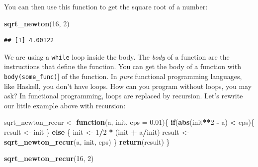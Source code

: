 \documentclass[]{gitbook}
\newenvironment{Shaded}{\begin{snugshade}}{\end{snugshade}}
\newcommand{\ControlFlowTok}[1]{\textcolor[rgb]{0.13,0.29,0.53}{\textbf{#1}}}
\newcommand{\DataTypeTok}[1]{\textcolor[rgb]{0.13,0.29,0.53}{#1}}
\newcommand{\DecValTok}[1]{\textcolor[rgb]{0.00,0.00,0.81}{#1}}
\newcommand{\FloatTok}[1]{\textcolor[rgb]{0.00,0.00,0.81}{#1}}
\newcommand{\KeywordTok}[1]{\textcolor[rgb]{0.13,0.29,0.53}{\textbf{#1}}}
\newcommand{\NormalTok}[1]{#1}
\newcommand{\OperatorTok}[1]{\textcolor[rgb]{0.81,0.36,0.00}{\textbf{#1}}}
\newcommand{\StringTok}[1]{\textcolor[rgb]{0.31,0.60,0.02}{#1}}
\theoremstyle{definition}
\theoremstyle{definition}
\theoremstyle{definition}
\theoremstyle{remark}
\begin{document}
You can then use this function to get the square root of a number:

\begin{Shaded}
\begin{Highlighting}[]
\KeywordTok{sqrt_newton}\NormalTok{(}\DecValTok{16}\NormalTok{, }\DecValTok{2}\NormalTok{)}
\end{Highlighting}
\end{Shaded}

\begin{verbatim}
## [1] 4.00122
\end{verbatim}

We are using a \texttt{while} loop inside the body. The \emph{body} of a
function are the instructions that define the function. You can get the
body of a function with \texttt{body(some\_func)}{]} of the function. In
\emph{pure} functional programming languages, like Haskell, you don't
have loops. How can you program without loops, you may ask? In
functional programming, loops are replaced by recursion. Let's rewrite
our little example above with recursion:

\begin{Shaded}
\begin{Highlighting}[]
\NormalTok{sqrt_newton_recur <-}\StringTok{ }\ControlFlowTok{function}\NormalTok{(a, init, }\DataTypeTok{eps =} \FloatTok{0.01}\NormalTok{)\{}
    \ControlFlowTok{if}\NormalTok{(}\KeywordTok{abs}\NormalTok{(init}\OperatorTok{**}\DecValTok{2} \OperatorTok{-}\StringTok{ }\NormalTok{a) }\OperatorTok{<}\StringTok{ }\NormalTok{eps)\{}
\NormalTok{        result <-}\StringTok{ }\NormalTok{init}
\NormalTok{    \} }\ControlFlowTok{else}\NormalTok{ \{}
\NormalTok{        init <-}\StringTok{ }\DecValTok{1}\OperatorTok{/}\DecValTok{2} \OperatorTok{*}\StringTok{ }\NormalTok{(init }\OperatorTok{+}\StringTok{ }\NormalTok{a}\OperatorTok{/}\NormalTok{init)}
\NormalTok{        result <-}\StringTok{ }\KeywordTok{sqrt_newton_recur}\NormalTok{(a, init, eps)}
\NormalTok{    \}}
    \KeywordTok{return}\NormalTok{(result)}
\NormalTok{\}}
\end{Highlighting}
\end{Shaded}

\begin{Shaded}
\begin{Highlighting}[]
\KeywordTok{sqrt_newton_recur}\NormalTok{(}\DecValTok{16}\NormalTok{, }\DecValTok{2}\NormalTok{)}
\end{Highlighting}
\end{Shaded}
\end{document}
